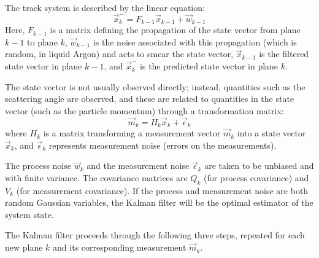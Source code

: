 The track system is described by the linear equation:~\citep{Ankowski2006}
\begin{equation}\label{eqn:kalman_track_system}
    \vec{x}_k^{-} = F_{k-1} \vec{x}_{k-1} + \vec{w}_{k-1}
\end{equation}
Here, $F_{k-1}$ is a matrix defining the propagation of the state vector from plane $k-1$ to plane $k$, $\vec{w}_{k-1}$ is the noise associated with this propagation (which is random, in liquid Argon) and acts to smear the state vector, $\vec{x}_{k-1}$ is the filtered state vector in plane $k-1$, and $\vec{x}_k^{-}$ is the predicted state vector in plane $k$.

The state vector is not usually observed directly; instead, quantities such as the scattering angle are observed, and these are related to quantities in the state vector (such as the particle momentum) through a transformation matrix:
\begin{equation}\label{eqn:kalman_measurement_equation}
    \vec{m}_k = H_k \vec{x}_k + \vec{\epsilon}_k
\end{equation}
where $H_k$ is a matrix transforming a measurement vector $\vec{m}_k$ into a state vector $\vec{x}_k$, and $\vec{\epsilon}_k$ represents measurement noise (errors on the measurements).

The process noise $\vec{w}_k$ and the measurement noise $\vec{\epsilon}_k$ are taken to be unbiased and with finite variance. The covariance matrices are $Q_k$ (for process covariance) and $V_k$ (for measurement covariance). If the process and measurement noise are both random Gaussian variables, the Kalman filter will be the optimal estimator of the system state.

The Kalman filter proceeds through the following three steps, repeated for each new plane $k$ and its corresponding measurement $\vec{m}_k$.

